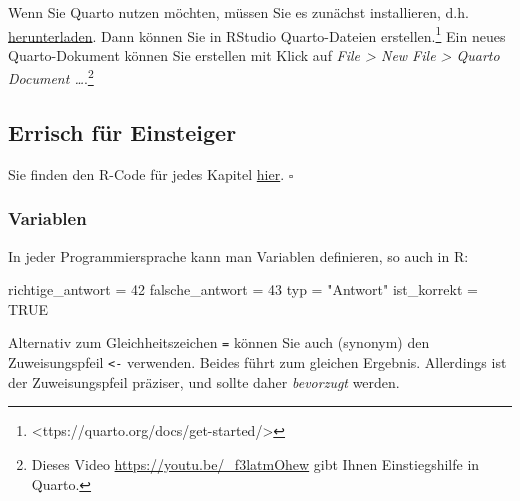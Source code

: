 \documentclass[
  letterpaper,
  DIV=11,
  numbers=noendperiod]{scrartcl}
\newenvironment{Shaded}{\begin{snugshade}}{\end{snugshade}}
\newcommand{\ConstantTok}[1]{\textcolor[rgb]{0.56,0.35,0.01}{#1}}
\newcommand{\DecValTok}[1]{\textcolor[rgb]{0.68,0.00,0.00}{#1}}
\newcommand{\NormalTok}[1]{\textcolor[rgb]{0.00,0.23,0.31}{#1}}
\newcommand{\OtherTok}[1]{\textcolor[rgb]{0.00,0.23,0.31}{#1}}
\newcommand{\StringTok}[1]{\textcolor[rgb]{0.13,0.47,0.30}{#1}}
\theoremstyle{definition}
\theoremstyle{definition}
\theoremstyle{definition}
\theoremstyle{remark}
\begin{document}
Wenn Sie Quarto nutzen möchten, müssen Sie es zunächst installieren,
d.h. \href{https://quarto.org/docs/get-started/}{herunterladen}. Dann
können Sie in RStudio Quarto-Dateien erstellen.\footnote{\textless ttps://quarto.org/docs/get-started/\textgreater{}}
Ein neues Quarto-Dokument können Sie erstellen mit Klick auf \emph{File
\textgreater{} New File \textgreater{} Quarto Document
\ldots{}}.\footnote{Dieses Video \url{https://youtu.be/_f3latmOhew} gibt
  Ihnen Einstiegshilfe in Quarto.}

\subsection{Errisch für Einsteiger}\label{errisch-fuxfcr-einsteiger}

\begin{tcolorbox}[enhanced jigsaw, coltitle=black, colframe=quarto-callout-note-color-frame, opacityback=0, toprule=.15mm, opacitybacktitle=0.6, arc=.35mm, titlerule=0mm, toptitle=1mm, title=\textcolor{quarto-callout-note-color}{\faInfo}\hspace{0.5em}{Note}, bottomtitle=1mm, leftrule=.75mm, breakable, rightrule=.15mm, colbacktitle=quarto-callout-note-color!10!white, bottomrule=.15mm, colback=white, left=2mm]

Sie finden den R-Code für jedes Kapitel
\href{https://github.com/sebastiansauer/statistik1/tree/main/R-code-for-all-chapters}{hier}.
\(\square\)

\end{tcolorbox}

\subsubsection{Variablen}\label{sec-rvars}

In jeder Programmiersprache kann man Variablen definieren, so auch in R:

\begin{Shaded}
\begin{Highlighting}[]
\NormalTok{richtige\_antwort }\OtherTok{=} \DecValTok{42}
\NormalTok{falsche\_antwort }\OtherTok{=} \DecValTok{43}
\NormalTok{typ }\OtherTok{=} \StringTok{"Antwort"}
\NormalTok{ist\_korrekt }\OtherTok{=} \ConstantTok{TRUE}
\end{Highlighting}
\end{Shaded}

Alternativ zum Gleichheitszeichen \texttt{=} können Sie auch (synonym)
den Zuweisungspfeil \texttt{\textless{}-} verwenden. Beides führt zum
gleichen Ergebnis. Allerdings ist der Zuweisungspfeil präziser, und
sollte daher \emph{bevorzugt} werden.
\end{document}
